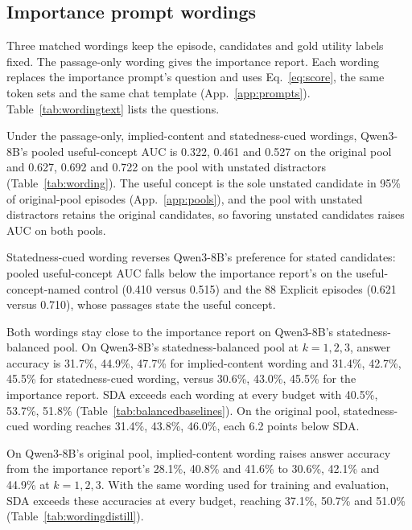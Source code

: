 \subsection{Importance prompt wordings}
\label{app:wording}

Three matched wordings keep the episode, candidates and gold utility labels fixed. The passage-only wording gives the importance report. Each wording replaces the importance prompt's question and uses Eq.~\eqref{eq:score}, the same token sets and the same chat template (App.~\ref{app:prompts}). Table~\ref{tab:wordingtext} lists the questions.

Under the passage-only, implied-content and statedness-cued wordings, Qwen3-8B's pooled useful-concept AUC is 0.322, 0.461 and 0.527 on the original pool and 0.627, 0.692 and 0.722 on the pool with unstated distractors (Table~\ref{tab:wording}). The useful concept is the sole unstated candidate in 95\% of original-pool episodes (App.~\ref{app:pools}), and the pool with unstated distractors retains the original candidates, so favoring unstated candidates raises AUC on both pools.

Statedness-cued wording reverses Qwen3-8B's preference for stated candidates: pooled useful-concept AUC falls below the importance report's on the useful-concept-named control (0.410 versus 0.515) and the 88 Explicit episodes (0.621 versus 0.710), whose passages state the useful concept.

Both wordings stay close to the importance report on Qwen3-8B's statedness-balanced pool.
On Qwen3-8B's statedness-balanced pool at $k=1,2,3$, answer accuracy is 31.7\%, 44.9\%, 47.7\% for implied-content wording and 31.4\%, 42.7\%, 45.5\% for statedness-cued wording, versus 30.6\%, 43.0\%, 45.5\% for the importance report.
SDA exceeds each wording at every budget with 40.5\%, 53.7\%, 51.8\% (Table~\ref{tab:balancedbaselines}).
On the original pool, statedness-cued wording reaches 31.4\%, 43.8\%, 46.0\%, each 6.2 points below SDA.

On Qwen3-8B's original pool, implied-content wording raises answer accuracy from the importance report's 28.1\%, 40.8\% and 41.6\% to 30.6\%, 42.1\% and 44.9\% at $k=1,2,3$.
With the same wording used for training and evaluation, SDA exceeds these accuracies at every budget, reaching 37.1\%, 50.7\% and 51.0\% (Table~\ref{tab:wordingdistill}).






